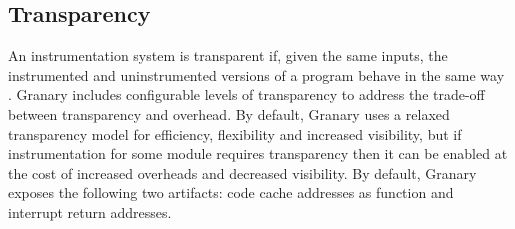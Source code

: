 \documentclass[preprint]{sigplanconf}
\newcommand{\toolname}[1]{{\scshape #1}}
\begin{document}









\subsection{Transparency}\label{sec:transparency}
An instrumentation system is transparent if, given the same inputs, the instrumented and uninstrumented versions of a program behave in the same way \cite{Transparency}. Granary includes configurable levels of transparency to address the trade-off between transparency and overhead. By default, Granary uses a relaxed transparency model for efficiency, flexibility and increased visibility, but if instrumentation for some module requires transparency then it can be enabled at the cost of increased overheads and decreased visibility. By default, Granary exposes the following two artifacts: code cache addresses as function and interrupt return addresses.
\end{document}
